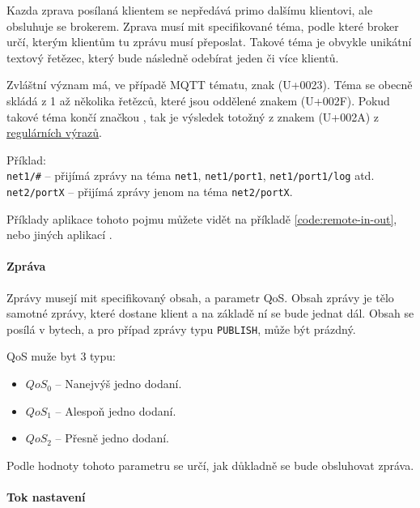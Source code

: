 Kazda zprava posílaná klientem se nepředává primo dalšímu klientovi, ale obsluhuje se brokerem. Zprava musí mit specifikované téma, podle které broker určí, kterým klientům tu zprávu musí přeposlat. Takové téma je obvykle unikátní textový řetězec, který bude následně odebírat jeden či více klientů.

Zvláštní význam má, ve případě MQTT tématu, znak \uv{\#} (U+0023). Téma se obecně skládá z 1 až několika řetězců, které jsou oddělené znakem \uv{/} (U+002F). Pokud takové téma končí značkou \uv{\#}, tak je výsledek totožný z  znakem \uv{*} (U+002A) z \href{https://en.wikipedia.org/wiki/Regular_expression}{regulárních výrazů}.

\begin{tabbing}
 Příklad: \= \\
 \> \texttt{net1/\#} -- přijímá zprávy na téma \texttt{net1}, \texttt{net1/port1}, \texttt{net1/port1/log} atd.\\
 \> \texttt{net2/portX} -- přijímá zprávy jenom na téma \texttt{net2/portX}. \\
\end{tabbing}

Příklady aplikace tohoto pojmu můžete vidět na příkladě \ref{code:remote-in-out}, nebo jiných aplikací \todo{}.

\paragraph{Zpráva}
\label{par:message}

Zprávy musejí mit specifikovaný obsah, a parametr QoS. Obsah zprávy je tělo samotné zprávy, které dostane klient a na základě ní se bude jednat dál. Obsah se posílá v bytech, a pro případ zprávy typu \texttt{PUBLISH}, může být prázdný.

QoS muže byt 3 typu:
\begin{itemize}
  \item $QoS_0$ -- Nanejvýš jedno dodaní.
  \item $QoS_1$ -- Alespoň jedno dodaní.
  \item $QoS_2$ -- Přesně jedno dodaní.
\end{itemize}

Podle hodnoty tohoto parametru se určí, jak důkladně se bude obsluhovat zpráva.

\paragraph{Tok nastavení}

